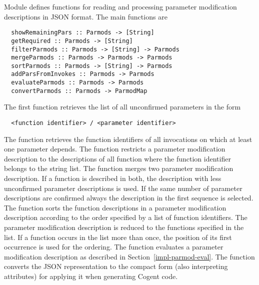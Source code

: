 Module  defines functions for reading and processing parameter modification descriptions in JSON format.
The main functions are 
\begin{verbatim}
  showRemainingPars :: Parmods -> [String]
  getRequired :: Parmods -> [String]
  filterParmods :: Parmods -> [String] -> Parmods
  mergeParmods :: Parmods -> Parmods -> Parmods
  sortParmods :: Parmods -> [String] -> Parmods
  addParsFromInvokes :: Parmods -> Parmods
  evaluateParmods :: Parmods -> Parmods
  convertParmods :: Parmods -> ParmodMap
\end{verbatim}
The first function retrieves the list of all unconfirmed parameters in the form
\begin{verbatim}
  <function identifier> / <parameter identifier>
\end{verbatim}
The function  retrieves the function identifiers of all invocations on which at least one parameter depends.
The function  restricts a parameter modification description to the descriptions of all function
where the function identifier belongs to the string list. 
The function  merges two parameter modification description. If a function is described in both, the description
with less unconfirmed parameter descriptions is used. If the same number of parameter descriptions are confirmed 
always the description in the first sequence is selected. The function  sorts the function descriptions
in a parameter modification description according to the order specified by a list of function identifiers. The parameter
modification description is reduced to the functions specified in the list. If a function occurs in the list more than once, 
the position of its first occurrence is used for the ordering.
The function  evaluates a parameter modification description as described in 
Section~\ref{impl-parmod-eval}. The function  converts the JSON representation to the compact
form  (also interpreting  attributes) for applying it when generating Cogent code.
